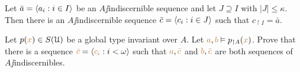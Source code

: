 \documentclass[creche.tex]{subfiles}
\begin{document}
\begin{exercise}
Let $\bar a=\langle a_i:i\in I\rangle$ be an $A\jj$indiscernible sequence and let $J\supseteq I$ with $|J|\le \kappa$.
Then there is an $A\jj$indiscernible sequence $\bar c=\langle c_i:i\in J\rangle$ such that $c_{\restriction I}=\bar a$.\QED
\end{exercise}

\begin{exercise}
Let  $p({\color{brown} x})\in S(\EuScript U)$ be a global type invariant over $A$.
Let ${\color{brown} a},
{\color{brown} b}\vDash p_{\restriction A}({\color{brown} x})$.
Prove that there is a sequence ${\color{brown}\bar c}=\langle{\color{brown}c_i}:i<\omega\rangle$ such that ${\color{brown} a},{\color{brown}\bar c}$ and ${\color{brown} b},{\color{brown}\bar c}$ are both sequences of $A\jj$indiscernibles.\QED
\end{exercise}

\begin{comment}
\section{Indempotents types in semigroups}\label{semigroups}

\def\medrel#1{\parbox[t]{6ex}{$\displaystyle\hfil #1$}}
\def\ceq#1#2#3{\parbox[t]{22ex}{$\displaystyle #1$}\medrel{#2}{$\displaystyle #3$}}

In this and the following sections we focus on semigroups definable in a first-order structure.
For a lighter notation,
we identify our semigroup with $\mrU$,
which here denotes the domain of a sort in a many-sorted monster model.
The language contains,
among others,
the symbol \emph{$\ \cdot\ $} which is interpreted as binary associative operation on $\mrU$.

We fix a set of parameters $A$,
not necessarily all of the same sort.
For any two sets $\mrA,\mrB\subseteq\mrU$ we define

\ceq{\hfill\emph{$\mrA\cdot_{\!A}\mrB$}}
{=}
{\Big\{ {\mr a}{\cdot}{\mr b}\ :\ {\mr a}\in\mrA, \ {\mr b}\in\mrB\textrm{ and }\ {\mr a}\nonforkc_{\!A}{\mr b}\Big\}}

We write \emph{${\mr a}\cdot_{\!A}\mrB$} for $\{{\mr a}\}\cdot_{\!A}\mrB$.
Similarly for \emph{$\mrA\cdot_{\!A}{\mr b}$} and \emph{${\mr a}\cdot_{\!A}{\mr b}$}.
Clearly,
the latter is either $\{{\mr a}{\cdot}{\mr b}\}$  or empty set.

Note that unless we add assumptions on $\nonforkc_{\!A}$ or on the underlying theory,
there is no guarantee that $\mrA\cdot_{\!A}\mrB$ is non empty,
not even when these sets are $A$-invariant.
With this proviso,
we proceed but with caution.


\end{comment}
\end{document}
